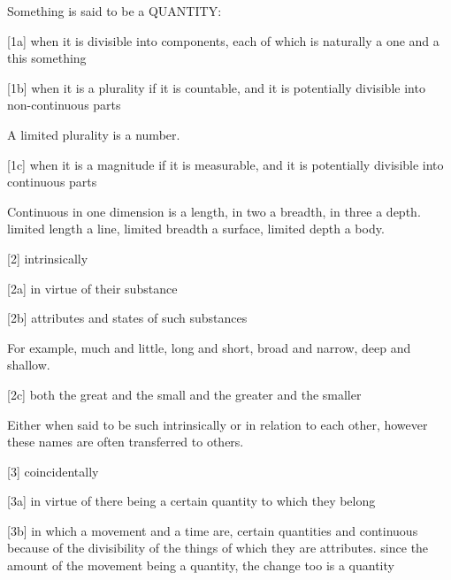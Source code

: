 
Something is said to be a QUANTITY:

[1a]    when it is divisible into components,
        each of which is naturally a one and a this something

[1b]    when it is a plurality if it is countable,
        and it is potentially divisible into non-continuous parts
        
        A limited plurality is a number.

[1c]    when it is a magnitude if it is measurable,
        and it is potentially divisible into continuous parts
        
        Continuous in one dimension is a length, in two a breadth, in three a depth. 
        limited length a line, limited breadth a surface, limited depth a body.

[2]     intrinsically

[2a]    in virtue of their substance

[2b]    attributes and states of such substances

        For example, much and little, long and short, broad and narrow, deep and shallow.

[2c]    both the great and the small and the greater and the smaller

        Either when said to be such intrinsically or in relation to each other,
        however these names are often transferred to others.

[3]     coincidentally

[3a]    in virtue of there being a certain quantity to which they belong

[3b]    in which a movement and a time are, certain quantities and continuous
        because of the divisibility of the things of which they are attributes.
        since the amount of the movement being a quantity, the change too is a quantity
